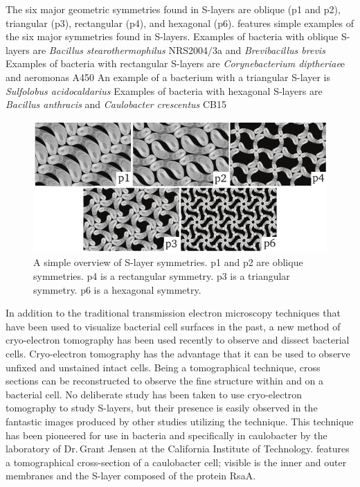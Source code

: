 The six major geometric symmetries found in
\acp{S-layer} are oblique (p1 and p2), triangular (p3), rectangular (p4), and hexagonal
(p6).   features simple examples of the six major
symmetries found in \acp{S-layer}.  Examples of bacteria with oblique \acp{S-layer} are
\textit{Bacillus stearothermophilus} NRS2004$/$3a and
\textit{Brevibacillus brevis} Examples of bacteria with rectangular
\acp{S-layer} are \textit{Corynebacterium
  diptheriae}e and \acl{aeromonas}
A450 An example of a bacterium with a
triangular \ac{S-layer} is \textit{Sulfolobus acidocaldarius} Examples
of bacteria with hexagonal \acp{S-layer} are \textit{Bacillus anthracis}
and \textit{Caulobacter crescentus} CB15

\begin{figure}[htb] %
  \begin{center}
    \includegraphics[]{intro/img/symmetries.pdf}
  \end{center}
  \caption[A simple overview of \ac{S-layer} symmetries]{A simple overview of \ac{S-layer}
    symmetries. p1 and p2 are oblique symmetries.  p4 is a rectangular symmetry.  p3 is a triangular
    symmetry.  p6 is a hexagonal symmetry.}
  \label{fig:symmetries}
\end{figure}
   
In addition to the traditional transmission electron microscopy techniques that have been used to
visualize bacterial cell surfaces in the past, a new method of cryo-electron tomography has been
used recently to observe and dissect bacterial cells. Cryo-electron tomography has the advantage
that it can be used to observe unfixed and unstained intact cells. Being a tomographical technique, cross
sections can be reconstructed to observe the fine structure within and on a bacterial cell. No
deliberate study has been taken to use cryo-electron tomography to study \acp{S-layer}, but their
presence is easily observed in the fantastic images produced by other studies utilizing the
technique. This technique has been pioneered for use in bacteria and specifically in \ac{caulobacter} by the laboratory of Dr.\,Grant Jensen at the California Institute of Technology.   features a tomographical cross-section of a \ac{caulobacter} cell; visible is the inner and outer membranes and the \ac{S-layer} composed of the protein RsaA.


